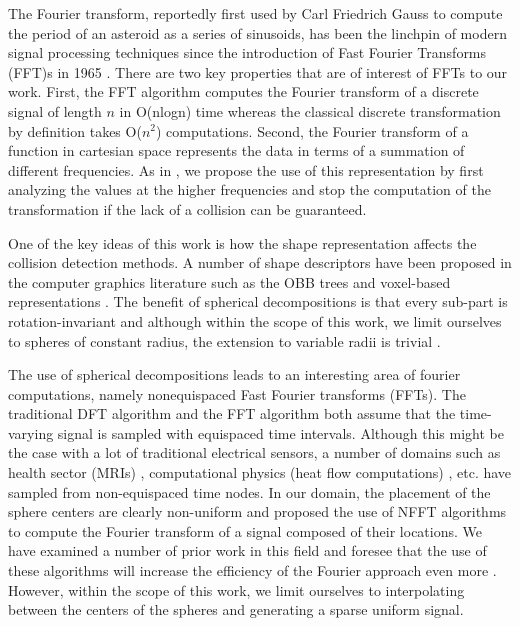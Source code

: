 \documentclass[letterpaper, 10 pt, conference]{ieeeconf}
\begin{document}
The Fourier transform, reportedly first used by Carl Friedrich Gauss to compute the period of
an asteroid as a series of sinusoids, has been the linchpin of modern signal processing techniques
since the introduction of Fast Fourier Transforms (FFT)s in 1965 \cite{cooley1965algorithm}. There 
are two key properties that are of interest of FFTs to our work. First, the FFT algorithm computes
the Fourier transform of a discrete signal of length $n$ in O(nlogn) time whereas the classical 
discrete transformation by definition takes O($n^2$) computations. Second, the Fourier transform
of a function in cartesian space represents the data in terms of a summation of different
frequencies. As in \cite{lysenko2013fourier}, we propose the use of this representation by 
first analyzing the values at the higher frequencies and stop the computation of the transformation
if the lack of a collision can be guaranteed. 

One of the key ideas of this work is how the shape representation affects the collision detection
methods. A number of shape descriptors have been proposed in the computer graphics literature 
such as the OBB trees \cite{gottschalk1996obbtree} and voxel-based representations \cite{sagardia2014new}.
The benefit of spherical decompositions is that every sub-part is rotation-invariant and although
within the scope of this work, we limit ourselves to spheres of constant radius, the extension
to variable radii is trivial \cite{behandish2016analytic}. 

The use of spherical decompositions leads to an interesting area of fourier computations,
namely nonequispaced Fast Fourier transforms (FFTs). The traditional DFT algorithm and the
FFT algorithm both assume that the time-varying signal is sampled with equispaced time 
intervals. Although this might be the case with a lot of traditional electrical sensors,
a number of domains such as health sector (MRIs) \cite{knopp2007note}, computational
physics (heat flow computations) \cite{lee2005type}, etc. have sampled from non-equispaced
time nodes. In our domain, the placement of the sphere centers are clearly non-uniform
and \cite{behandish2016analytic} proposed the use of NFFT algorithms to compute
the Fourier transform of a signal composed of their locations. We have examined a number
of prior work in this field \cite{dutt1993fast, dutt1995fast, potts2001fast} and foresee
that the use of these algorithms will increase the efficiency of the Fourier approach
even more \cite{keiner2009using}. However, within the scope of this work, we limit
ourselves to interpolating between the centers of the spheres and generating a 
sparse uniform signal. 
\end{document}
